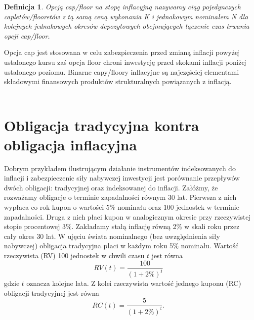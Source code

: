 \documentclass{mini}
\theoremstyle{mythstyle}
\newtheorem{Definicja}{Definicja}[chapter]
\begin{document}
	\begin{Definicja}
		Opcją cap/floor na stopę inflacyjną nazywamy ciąg pojedynczych capletów/flooretów z tą samą ceną wykonania K i jednakowym nominałem N dla kolejnych jednakowych okresów depozytowych obejmujących łączenie czas trwania opcji cap/floor.
	\end{Definicja}

	Opcja cap jest stosowana w celu zabezpieczenia przed zmianą inflacji powyżej ustalonego kursu zaś opcja floor chroni inwestycję przed skokami inflacji poniżej ustalonego poziomu. Binarne capy/floory inflacyjne są najczęściej elementami składowymi finansowych produktów strukturalnych powiązanych z inflacją.\\\\
	
	\section{Obligacja tradycyjna kontra obligacja inflacyjna}
	
	Dobrym przykładem ilustrującym działanie instrumentów indeksowanych do inflacji i zabezpieczenie siły nabywczej inwestycji jest porównanie przepływów dwóch obligacji: tradycyjnej oraz indeksowanej do inflacji. Załóżmy, że rozważamy obligacje o terminie zapadalności równym 30 lat. Pierwsza z nich wypłaca co rok kupon o wartości 5\% nominału oraz 100 jednostek w terminie zapadalności. Druga z nich płaci kupon w analogicznym okresie przy rzeczywistej stopie procentowej 3\%. Zakładamy stałą inflację równą 2\% w skali roku przez cały okres 30 lat.
	W ujęciu świata nominalnego (bez uwzględnienia siły nabywczej) obligacja tradycyjna płaci w każdym roku 5\% nominału. Wartość rzeczywista (RV) 100 jednostek w chwili czasu $t$ jest równa
	\begin{equation*}
		RV(t) = \frac{100}{(1+2\%)^t}
	\end{equation*}
	gdzie $t$ oznacza kolejne lata. Z kolei rzeczywista wartość jednego kuponu (RC) obligacji tradycyjnej jest równa
	\begin{equation*}
	RC(t) = \frac{5}{(1+2\%)^t}.
	\end{equation*}
	
\end{document}
